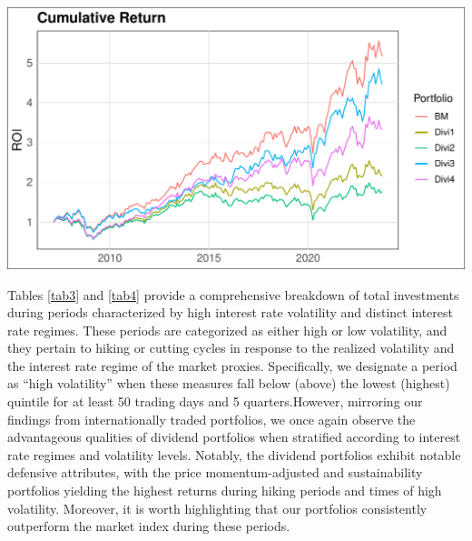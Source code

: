 \documentclass[12pt,preprint, authoryear]{elsarticle}
\let\origfigure\figure
\let\endorigfigure\endfigure
\renewenvironment{figure}[1][2] {
    \expandafter\origfigure\expandafter[H]
} {
    \endorigfigure
}
\numberwithin{equation}{section}
\numberwithin{figure}{section}
\numberwithin{table}{section}
\begin{document}
\begin{figure}[H]

\includegraphics{Much_Ado_About_Dividends_files/figure-latex/Figure3-1} \hfill{}

\caption{Rolling 3 Year Returns \label{fig3}}\label{fig:Figure3}
\end{figure}

Tables \ref{tab3} and \ref{tab4} provide a comprehensive breakdown of
total investments during periods characterized by high interest rate
volatility and distinct interest rate regimes. These periods are
categorized as either high or low volatility, and they pertain to hiking
or cutting cycles in response to the realized volatility and the
interest rate regime of the market proxies. Specifically, we designate a
period as ``high volatility'' when these measures fall below (above) the
lowest (highest) quintile for at least 50 trading days and 5
quarters.However, mirroring our findings from internationally traded
portfolios, we once again observe the advantageous qualities of dividend
portfolios when stratified according to interest rate regimes and
volatility levels. Notably, the dividend portfolios exhibit notable
defensive attributes, with the price momentum-adjusted and
sustainability portfolios yielding the highest returns during hiking
periods and times of high volatility. Moreover, it is worth highlighting
that our portfolios consistently outperform the market index during
these periods.
\end{document}
